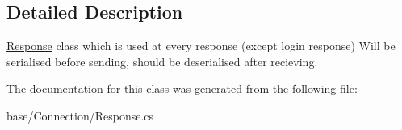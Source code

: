\subsection{Detailed Description}
\hyperlink{classCore_1_1Connections_1_1Response}{Response} class which is used at every response (except login response) Will be serialised before sending, should be deserialised after recieving. 



The documentation for this class was generated from the following file\-:\begin{DoxyCompactItemize}
\item 
base/\-Connection/Response.\-cs\end{DoxyCompactItemize}
